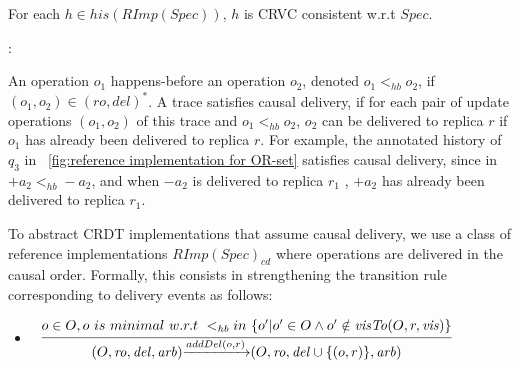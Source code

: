 \begin{theorem}
\label{theorem:histories of reference implementation are SRV consistent}
For each $h \in \mathit{his}(\mathit{RImp}(\mathit{Spec}))$, $h$ is CRVC consistent w.r.t $\mathit{Spec}$.
\end{theorem}


:

An operation $o_1$ happens-before \cite{Lamport:1978} an operation $o_2$, denoted $o_1 <_{\mathit{hb}} o_2$, if $(o_1,o_2) \in (\mathit{ro},\mathit{del})^*$. A trace satisfies causal delivery, if for each pair of update operations $(o_1,o_2)$ of this trace and $o_1 <_{\mathit{hb}} o_2$, $o_2$ can be delivered to replica $r$ if $o_1$ has already been delivered to replica $r$. {\color {red}For example, the annotated history of $q_3$ in \figurename~\ref{fig:reference implementation for OR-set} satisfies causal delivery, since in $+a_2 <_{\mathit{hb}} -a_2$, and when $-a_2$ is delivered to replica $r_1$ , $+a_2$ has already been delivered to replica $r_1$.}

To abstract CRDT implementations that assume causal delivery, we use a class of reference implementations $\mathit{RImp}(\mathit{Spec})_{\mathit{cd}}$ where operations are delivered in the causal order. Formally, this consists in strengthening the transition rule corresponding to delivery events as follows:


\begin {itemize}
\setlength{\itemsep}{0.5pt}
\item[-] $\begin{array}{l c} \bigfrac{o \in O, o \ is \ minimal \ w.r.t \ <_{\mathit{hb}} in \ \{ o' \vert o' \in O \wedge o' \notin \mathit{visTo}(O,r,\mathit{vis}) \}} {(O,\mathit{ro},\mathit{del},\mathit{arb}) {\xrightarrow{addDel(o,r)}} (O,\mathit{ro},\mathit{del} \cup \{ (o,r) \},\mathit{arb})} \end{array}$
\end{itemize}


